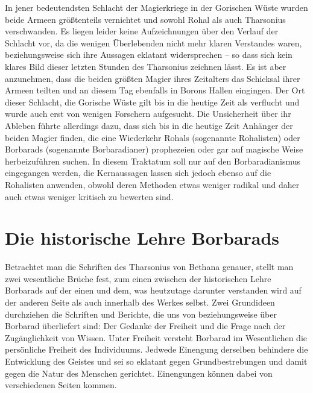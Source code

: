 \documentclass[11pt]{article}
\begin{document}
In jener bedeutendsten Schlacht der Magierkriege in der Gorischen Wüste wurden beide Armeen größtenteils vernichtet und sowohl Rohal als auch Tharsonius verschwanden. Es liegen leider keine Aufzeichnungen über den Verlauf der Schlacht vor, da die wenigen Überlebenden nicht mehr klaren Verstandes
waren, beziehungsweise sich ihre Aussagen eklatant widersprechen – so dass sich kein klares Bild dieser
letzten Stunden des Tharsonius zeichnen lässt. Es ist aber anzunehmen, dass die beiden größten Magier
ihres Zeitalters das Schicksal ihrer Armeen teilten und an diesem Tag ebenfalls in Borons Hallen eingingen. Der Ort dieser Schlacht, die Gorische Wüste gilt bis in die heutige Zeit als verflucht und wurde auch
erst von wenigen Forschern aufgesucht. Die Unsicherheit über ihr Ableben führte allerdings dazu, dass
sich bis in die heutige Zeit Anhänger der beiden Magier finden, die eine Wiederkehr Rohals (sogenannte
Rohalisten) oder Borbarads (sogenannte Borbaradianer) prophezeien oder gar auf magische Weise herbeizuführen suchen.
In diesem Traktatum soll nur auf den Borbaradianismus eingegangen werden, die Kernaussagen lassen
sich jedoch ebenso auf die Rohalisten anwenden, obwohl deren Methoden etwas weniger radikal und
daher auch etwas weniger kritisch zu bewerten sind.

\section{Die historische Lehre Borbarads}
Betrachtet man die Schriften des Tharsonius von Bethana genauer, stellt man zwei wesentliche Brüche
fest, zum einen zwischen der historischen Lehre Borbarads auf der einen und dem, was heutzutage darunter verstanden wird auf der anderen Seite als auch innerhalb des Werkes selbst.
Zwei Grundideen durchziehen die Schriften und Berichte, die uns von beziehungsweise über Borbarad
überliefert sind: Der Gedanke der Freiheit und die Frage nach der Zugänglichkeit von Wissen.
Unter Freiheit versteht Borbarad im Wesentlichen die persönliche Freiheit des Individuums. Jedwede
Einengung derselben behindere die Entwicklung des Geistes und sei so eklatant gegen Grundbestrebungen und damit gegen die Natur des Menschen gerichtet. Einengungen können dabei von verschiedenen
Seiten kommen.
\end{document}

